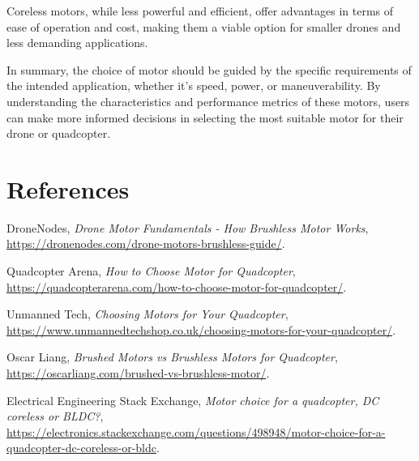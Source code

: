 \documentclass[12pt]{article}
\begin{document}
	Coreless motors, while less powerful and efficient, offer advantages in terms of ease of operation and cost, making them a viable option for smaller drones and less demanding applications.
	
	In summary, the choice of motor should be guided by the specific requirements of the intended application, whether it's speed, power, or maneuverability. By understanding the characteristics and performance metrics of these motors, users can make more informed decisions in selecting the most suitable motor for their drone or quadcopter.
	
	\section{References}
	\begin{thebibliography}{9}
		DroneNodes,
		\textit{Drone Motor Fundamentals - How Brushless Motor Works},
		\url{https://dronenodes.com/drone-motors-brushless-guide/}.
		
		Quadcopter Arena,
		\textit{How to Choose Motor for Quadcopter},
		\url{https://quadcopterarena.com/how-to-choose-motor-for-quadcopter/}.
		
		Unmanned Tech,
		\textit{Choosing Motors for Your Quadcopter},
		\url{https://www.unmannedtechshop.co.uk/choosing-motors-for-your-quadcopter/}.
		
		Oscar Liang,
		\textit{Brushed Motors vs Brushless Motors for Quadcopter},
		\url{https://oscarliang.com/brushed-vs-brushless-motor/}.
		
		Electrical Engineering Stack Exchange,
		\textit{Motor choice for a quadcopter, DC coreless or BLDC?},
		\url{https://electronics.stackexchange.com/questions/498948/motor-choice-for-a-quadcopter-dc-coreless-or-bldc}.
	\end{thebibliography}
	
	
\end{document}
